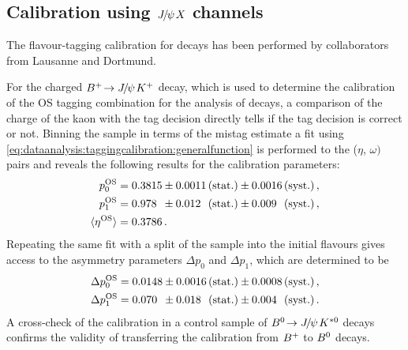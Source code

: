 
\subsection{Calibration using \texorpdfstring{${{J\mskip -3mu/\mskip -2mu\psi\mskip 2mu}}X$}{JpsiX} channels}
\label{sec:dataanalysis:taggingcalibration:jpsixcalibration}

The flavour-tagging calibration for \BdToJPsiKS decays has been performed by
collaborators from Lausanne and Dortmund.

For the charged ${{B}^+}\!\rightarrow {\ensuremath{{J\mskip -3mu/\mskip -2mu\psi\mskip 2mu}}}{\ensuremath{{K}^+}}$ decay, which is used to determine the calibration
of the OS tagging combination for the analysis of \BdToJPsiKS decays, a
comparison of the charge of the kaon with the tag decision directly tells if
the tag decision is correct or not. Binning the sample in terms of the mistag
estimate a \chisq fit using
\cref{eq:dataanalysis:taggingcalibration:generalfunction} is performed to the
($\eta$, $\omega)$ pairs and reveals the following results for the calibration
parameters:
\begin{equation}
\begin{aligned}
  p_0^{\text{OS}} &= 0.3815 \pm 0.0011 \text{\,(stat.)}
                            \pm 0.0016 \text{\,(syst.)} \, ,\\
  p_1^{\text{OS}} &= 0.978\phantom{0} \pm 0.012\phantom{0} \text{\,(stat.)}
                                      \pm 0.009\phantom{0} \text{\,(syst.)} \, ,\\
  \langle\eta^{\text{OS}}\rangle &= 0.3786 \, .
\end{aligned}
\label{eq:dataanalysis:taggingcalibration:jpsixcalibration:os_calibration_pars}
\end{equation}
Repeating the same fit with a split of the sample into the initial flavours
gives access to the asymmetry parameters $\Delta p_0$ and $\Delta p_1$, which
are determined to be
\begin{equation}
\begin{split}
  \Delta p_0^{\text{OS}} &= 0.0148 \pm 0.0016 \text{\,(stat.)} \pm  0.0008 \text{\,(syst.)} \, , \\
  \Delta p_1^{\text{OS}} &= 0.070\phantom{0} \pm 0.018\phantom{0} \text{\,(stat.)} \pm 0.004\phantom{0} \text{\,(syst.)} \,.
\end{split}
\label{eq:dataanalysis:taggingcalibration:jpsixcalibration:os_calibration_asymmetries}
\end{equation}
A cross-check of the calibration in a control sample of ${{B}^0}\!\rightarrow {\ensuremath{{J\mskip -3mu/\mskip -2mu\psi\mskip 2mu}}}{\ensuremath{{K}^{*0}}}$
decays confirms the validity of transferring the calibration from ${{B}^+}$ to
${{B}^0}$ decays.

